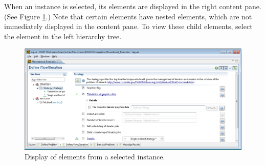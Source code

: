 When an instance is selected, its elements are displayed in the right
content pane. (See Figure \ref{fig:input:jag_graphical4}.)  Note that
certain elements have nested elements, which are not immediately
displayed in the content pane.  To view these child elements, select
the element in the left hierarchy tree.
\begin{figure}
  \centering
  \includegraphics[scale=0.4]{images/2_1jag_graphical4}
  \caption{Display of elements from a selected instance.}
  \label{fig:input:jag_graphical4}
\end{figure}

